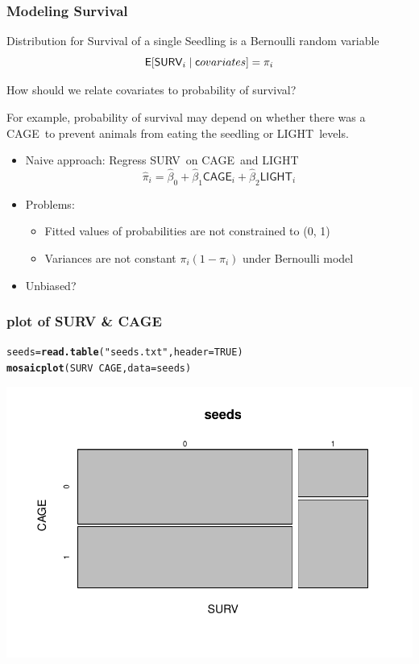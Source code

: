 \documentclass[handout]{beamer}\usepackage[]{graphicx}\usepackage[]{color}
\makeatletter
\def\maxwidth{ %
  \ifdim\Gin@nat@width>\linewidth
    \linewidth
  \else
    \Gin@nat@width
  \fi
}
\newcommand{\hlnum}[1]{\textcolor[rgb]{0.686,0.059,0.569}{#1}}%
\newcommand{\hlstr}[1]{\textcolor[rgb]{0.192,0.494,0.8}{#1}}%
\newcommand{\hlopt}[1]{\textcolor[rgb]{0,0,0}{#1}}%
\newcommand{\hlstd}[1]{\textcolor[rgb]{0.345,0.345,0.345}{#1}}%
\newcommand{\hlkwb}[1]{\textcolor[rgb]{0.69,0.353,0.396}{#1}}%
\newcommand{\hlkwc}[1]{\textcolor[rgb]{0.333,0.667,0.333}{#1}}%
\newcommand{\hlkwd}[1]{\textcolor[rgb]{0.737,0.353,0.396}{\textbf{#1}}}%
\newenvironment{kframe}{%
 \def\at@end@of@kframe{}%
 \ifinner\ifhmode%
  \def\at@end@of@kframe{\end{minipage}}%
  \begin{minipage}{\columnwidth}%
 \fi\fi%
 \def\FrameCommand##1{\hskip\@totalleftmargin \hskip-\fboxsep
 \colorbox{shadecolor}{##1}\hskip-\fboxsep
     \hskip-\linewidth \hskip-\@totalleftmargin \hskip\columnwidth}%
 \MakeFramed {\advance\hsize-\width
   \@totalleftmargin\z@ \linewidth\hsize
   \@setminipage}}%
 {\par\unskip\endMakeFramed%
 \at@end@of@kframe}
\newenvironment{knitrout}{}{} %
\def\C{\textsf{CAGE}}
\def\L{\textsf{LIGHT}}
\def\S{\textsf{SURV}}
\makeatother
\begin{document}
\begin{frame}\frametitle{Modeling Survival}
Distribution for Survival of a single Seedling is a Bernoulli random variable
$$  \E[\S_i \mid {\textsf covariates} ] = \pi_i $$ \pause

How should we relate covariates to probability of survival? \pause

For example, probability of survival may depend on whether there was a
\C\ to prevent animals from eating the seedling or \L\ levels. \pause
\begin{itemize}
\item Naive approach: Regress \S\ on \C\ and \L\
$$\hat{\pi}_i = \hat{\beta}_0 + \hat{\beta}_1 \C_i + \hat{\beta}_2 \L_i$$ \pause
\item Problems:
  \begin{itemize}
  \item  Fitted values of probabilities are not constrained to
  (0, 1) \pause
  \item Variances are not constant $\pi_i(1 - \pi_i)$ under Bernoulli model \pause
 \end{itemize}
\item Unbiased? \pause
\end{itemize}
\end{frame}

\begin{frame}[fragile]\frametitle{plot of SURV \& CAGE }

\begin{knitrout}
\color{fgcolor}\begin{kframe}
\begin{alltt}
\hlstd{seeds} \hlkwb{=} \hlkwd{read.table}\hlstd{(}\hlstr{"seeds.txt"}\hlstd{,} \hlkwc{header}\hlstd{=}\hlnum{TRUE}\hlstd{)}
\hlkwd{mosaicplot}\hlstd{(SURV} \hlopt{~} \hlstd{CAGE,} \hlkwc{data}\hlstd{=seeds)}
\end{alltt}
\end{kframe}
\includegraphics[width=\maxwidth]{figure/unnamed-chunk-2-1} 

\end{knitrout}
\end{frame}
\end{document}
